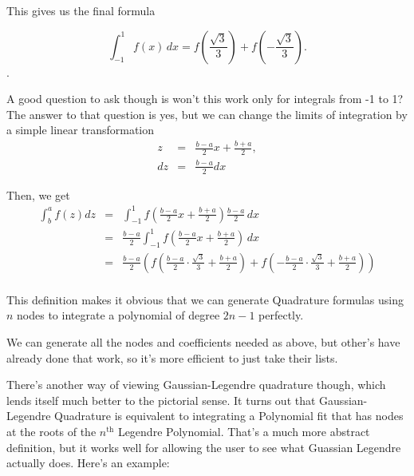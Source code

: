 \documentclass[12pt]{article}
\newcommand{\newLine}{\vspace{5mm}}
\newcommand{\integral}[3]{\text{$\int^{#2}_{#1} #3\,dx$}}
\begin{document}
This gives us the final formula

\begin{equation*} \integral{-1}{1}{f(x)} = f(\frac{\sqrt{3}}{3}) + f(-\frac{\sqrt{3}}{3}). \end{equation*}.

A good question to ask though is won't this work only for integrals from -1 to 1? The answer to that question is yes, but we can change the limits of integration by a simple linear transformation 
\begin{eqnarray*} z &=& \frac{b-a}{2}x + \frac{b+a}{2}, \\
dz &=& \frac{b-a}{2}dx
\end{eqnarray*}

\noindent Then, we get
\begin{eqnarray*}
\int^a_b f(z)dz &=& \integral{-1}{1}{f(\frac{b-a}{2}x + \frac{b+a}{2})\frac{b-a}{2}} \\
&=& \frac{b-a}{2}\integral{-1}{1}{f(\frac{b-a}{2}x + \frac{b+a}{2})} \\
&=& \frac{b-a}{2}\left(f(\frac{b-a}{2}\cdot\frac{\sqrt{3}}{3}+ \frac{b+a}{2}) + f(-\frac{b-a}{2}\cdot\frac{\sqrt{3}}{3}+ \frac{b+a}{2}) \right)\\
\end{eqnarray*}

This definition makes it obvious that we can generate Quadrature formulas using $n$ nodes to integrate a polynomial of degree $2n-1$ perfectly. 

We can generate all the nodes and coefficients needed as above, but other's have already done that work, so it's more efficient to just take their lists.

\newLine There's another way of viewing Gaussian-Legendre quadrature though, which lends itself much better to the pictorial sense. It turns out that Gaussian-Legendre Quadrature is equivalent to integrating a Polynomial fit that has nodes at the roots of the $n^{\text{th}}$ Legendre Polynomial. That's a much more abstract definition, but it works well for allowing the user to see what Guassian Legendre actually does. Here's an example:
\end{document}
